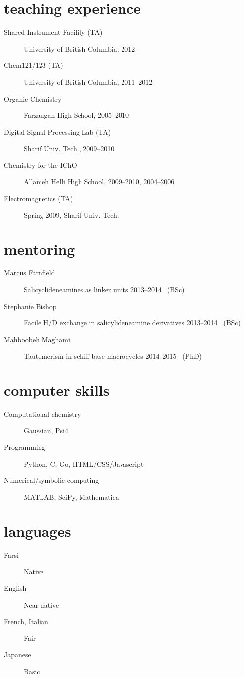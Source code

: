 \documentclass[overlapped,line,10pt,letterpaper]{res}
\begin{document}
\begin{resume}
\section{teaching experience}
\begin{description}
\item[Shared Instrument Facility (TA)] University of British Columbia, 2012–
\item[Chem121/123 (TA)] University of British Columbia, 2011–2012
\item[Organic Chemistry] Farzangan High School, 2005–2010
\item[Digital Signal Processing Lab (TA)] Sharif Univ. Tech., 2009–2010
\item[Chemistry for the IChO] Allameh Helli High School, 2009–2010, 2004–2006
\item[Electromagnetics (TA)] Spring 2009, Sharif Univ. Tech.
\end{description}

\section{mentoring}
\begin{description}
\item[Marcus Farnfield]  Salicyclideneamines as linker units \hspace{\fill} 2013–2014 \, (BSc)
\item[Stephanie Bishop] Facile H/D exchange in salicylideneamine derivatives \hspace{\fill} 2013–2014 \, (BSc)
\item[Mahboobeh Maghami] Tautomerism in schiff base macrocycles \hspace{\fill} 2014–2015 \, (PhD)
\end{description}

\section{computer skills}
\begin{description}
\item[Computational chemistry] Gaussian, Psi4
\item[Programming] Python, C, Go, HTML/CSS/Javascript
\item[Numerical/symbolic computing] MATLAB, SciPy, Mathematica
\end{description}

\section{languages}
\begin{description}
\item[Farsi] Native
\item[English] Near native
\item[French, Italian] Fair
\item[Japanese] Basic
\end{description}
\end{resume}
\end{document}
